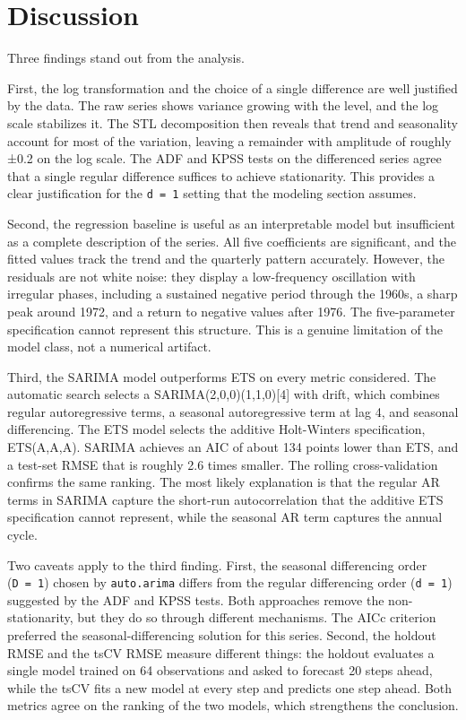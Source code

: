 \documentclass[
  english,
  a4paper,
]{article}
\begin{document}
\section{Discussion}\label{discussion}

Three findings stand out from the analysis.

First, the log transformation and the choice of a single difference are
well justified by the data. The raw series shows variance growing with
the level, and the log scale stabilizes it. The STL decomposition then
reveals that trend and seasonality account for most of the variation,
leaving a remainder with amplitude of roughly ±0.2 on the log scale. The
ADF and KPSS tests on the differenced series agree that a single regular
difference suffices to achieve stationarity. This provides a clear
justification for the \texttt{d\ =\ 1} setting that the modeling section
assumes.

Second, the regression baseline is useful as an interpretable model but
insufficient as a complete description of the series. All five
coefficients are significant, and the fitted values track the trend and
the quarterly pattern accurately. However, the residuals are not white
noise: they display a low-frequency oscillation with irregular phases,
including a sustained negative period through the 1960s, a sharp peak
around 1972, and a return to negative values after 1976. The
five-parameter specification cannot represent this structure. This is a
genuine limitation of the model class, not a numerical artifact.

Third, the SARIMA model outperforms ETS on every metric considered. The
automatic search selects a SARIMA(2,0,0)(1,1,0){[}4{]} with drift, which
combines regular autoregressive terms, a seasonal autoregressive term at
lag 4, and seasonal differencing. The ETS model selects the additive
Holt-Winters specification, ETS(A,A,A). SARIMA achieves an AIC of about
134 points lower than ETS, and a test-set RMSE that is roughly 2.6 times
smaller. The rolling cross-validation confirms the same ranking. The
most likely explanation is that the regular AR terms in SARIMA capture
the short-run autocorrelation that the additive ETS specification cannot
represent, while the seasonal AR term captures the annual cycle.

Two caveats apply to the third finding. First, the seasonal differencing
order (\texttt{D\ =\ 1}) chosen by \texttt{auto.arima} differs from the
regular differencing order (\texttt{d\ =\ 1}) suggested by the ADF and
KPSS tests. Both approaches remove the non-stationarity, but they do so
through different mechanisms. The AICc criterion preferred the
seasonal-differencing solution for this series. Second, the holdout RMSE
and the tsCV RMSE measure different things: the holdout evaluates a
single model trained on 64 observations and asked to forecast 20 steps
ahead, while the tsCV fits a new model at every step and predicts one
step ahead. Both metrics agree on the ranking of the two models, which
strengthens the conclusion.
\end{document}

